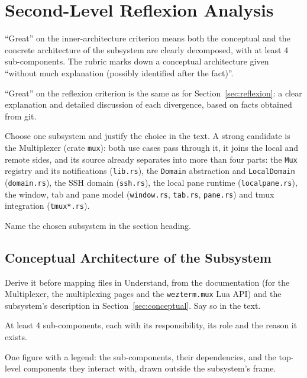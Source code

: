 \section{Second-Level Reflexion Analysis}
\label{sec:subsystem}


\begin{requirements}
  \item ``Great'' on the inner-architecture criterion means both the conceptual and the concrete architecture of the subsystem are clearly decomposed, with at least 4 sub-components. The rubric marks down a conceptual architecture given ``without much explanation (possibly identified after the fact)''.
  \item ``Great'' on the reflexion criterion is the same as for Section~\ref{sec:reflexion}: a clear explanation and detailed discussion of each divergence, based on facts obtained from git.
  \item Choose one subsystem and justify the choice in the text. A strong candidate is the Multiplexer (crate \texttt{mux}): both use cases pass through it, it joins the local and remote sides, and its source already separates into more than four parts: the \texttt{Mux} registry and its notifications (\texttt{lib.rs}), the \texttt{Domain} abstraction and \texttt{LocalDomain} (\texttt{domain.rs}), the SSH domain (\texttt{ssh.rs}), the local pane runtime (\texttt{localpane.rs}), the window, tab and pane model (\texttt{window.rs}, \texttt{tab.rs}, \texttt{pane.rs}) and tmux integration (\texttt{tmux*.rs}).
  \item Name the chosen subsystem in the section heading.
\end{requirements}

\subsection{Conceptual Architecture of the Subsystem}
\label{sec:subsystem-conceptual}

\begin{requirements}
  \item Derive it before mapping files in Understand, from the documentation (for the Multiplexer, the multiplexing pages and the \texttt{wezterm.mux} Lua API) and the subsystem's description in Section~\ref{sec:conceptual}. Say so in the text.
  \item At least 4 sub-components, each with its responsibility, its role and the reason it exists.
  \item One figure with a legend: the sub-components, their dependencies, and the top-level components they interact with, drawn outside the subsystem's frame.
\end{requirements}

